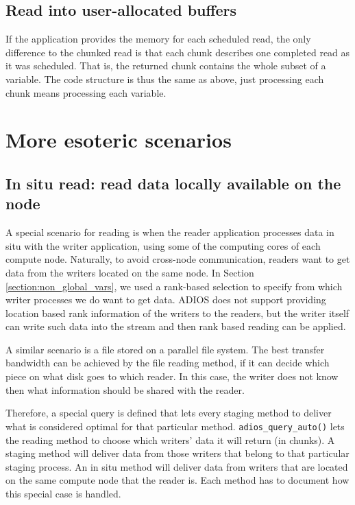 \subsection{Read into user-allocated buffers}
If the application provides the memory for each scheduled read, the only difference 
to the chunked read is that each chunk describes one completed read as it was scheduled.
That is, the returned chunk contains the whole subset of a variable. The code structure 
is thus the same as above, just processing each chunk means processing each variable.


\section {More esoteric scenarios}


\subsection{In situ read: read data locally available on the node}
A special scenario for reading is when the reader application processes data in situ with the writer application, using some of the computing cores of each compute node. Naturally, to avoid cross-node communication, readers want to get data from the writers located on the same node. In Section \ref {section:non_global_vars}, we used a rank-based selection to specify from which writer processes we do want to get data. ADIOS does not support providing location based rank information of the writers to the readers, but the writer itself can write such data into the stream and then rank based reading can be applied. 

A similar scenario is a file stored on a parallel file system. The best transfer bandwidth can be achieved by the file reading method, if it can decide which piece on what disk goes to which reader. In this case, the writer does not know then what information should be shared with the reader. 

Therefore, a special query is defined that lets every staging method to deliver what is considered optimal for that particular method. \lstinline+adios_query_auto()+ lets the reading method to choose which writers' data it will return (in chunks). A staging method will deliver data from those writers that belong to that particular staging process. An in situ method will deliver data from writers that are located on the same compute node that the reader is. Each method has to document how this special case is handled. 

